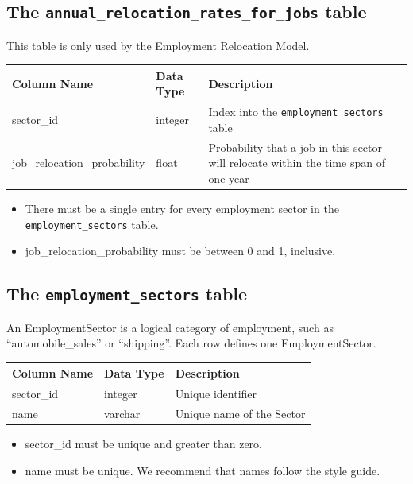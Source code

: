 \subsection{The {\tt annual_relocation_rates_for_jobs} table}

This table is only used by the Employment Relocation Model.

\begin{tabular}{llp{4in}}
\textbf{Column Name} & \textbf{Data Type} & \textbf{Description} \\
\hline
sector_id & integer &  Index into the \verb|employment_sectors| table   \\
\hline
job_relocation_probability & float & Probability that a job in this sector will relocate within the time span of one year  \\
\hline
\end{tabular}

\begin{itemize}
\tight
\item There must be a single entry for every employment sector in the
\verb|employment_sectors| table.
\item job_relocation_probability must be between 0 and 1, inclusive.
\end{itemize}

\subsection{The {\tt employment_sectors} table}

An EmploymentSector is a logical category of employment, such as
``automobile_sales'' or ``shipping''. Each row defines one EmploymentSector.

\begin{tabular}{lll}
\textbf{Column Name} & \textbf{Data Type} & \textbf{Description} \\
\hline
sector_id & integer & Unique identifier  \\
\hline
name & varchar & Unique name of the Sector  \\
\hline

\end{tabular}

\begin{itemize}
\tight
\item sector_id must be unique and greater than zero.
\item name must be unique. We recommend that names follow the style guide.

\end{itemize}

